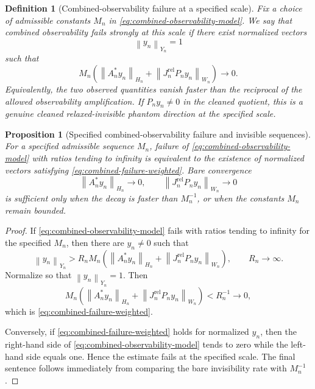 \documentclass[11pt]{article}
\numberwithin{equation}{section}
\newtheorem{proposition}[theorem]{Proposition}
\newtheorem{definition}[theorem]{Definition}
\newcommand{\norm}[2]{\left\|#1\right\|_{#2}}
\begin{document}
\begin{definition}[Combined-observability failure at a specified scale]
Fix a choice of admissible constants \(M_n\) in \eqref{eq:combined-observability-model}. We say that combined observability fails strongly at this scale if there exist normalized vectors
\[
\norm{y_n}{Y_n}=1
\]
such that
\begin{equation}\label{eq:combined-failure-weighted}
M_n\left(
\norm{A_n^*y_n}{H_n}
+
\norm{J_n^{\mathrm{rel}}P_ny_n}{W_n}
\right)
\to0.
\end{equation}
Equivalently, the two observed quantities vanish faster than the reciprocal of the allowed observability amplification.  If \(P_ny_n\neq0\) in the cleaned quotient, this is a genuine cleaned relaxed-invisible phantom direction at the specified scale.
\end{definition}

\begin{proposition}[Specified combined-observability failure and invisible sequences]
For a specified admissible sequence \(M_n\), failure of \eqref{eq:combined-observability-model} with ratios tending to infinity is equivalent to the existence of normalized vectors satisfying \eqref{eq:combined-failure-weighted}.  Bare convergence
\[
\norm{A_n^*y_n}{H_n}\to0,
\qquad
\norm{J_n^{\mathrm{rel}}P_ny_n}{W_n}\to0
\]
is sufficient only when the decay is faster than \(M_n^{-1}\), or when the constants \(M_n\) remain bounded.
\end{proposition}

\begin{proof}
If \eqref{eq:combined-observability-model} fails with ratios tending to infinity for the specified \(M_n\), then there are \(y_n\neq0\) such that
\[
\norm{y_n}{Y_n}
>
R_nM_n\left(
\norm{A_n^*y_n}{H_n}
+
\norm{J_n^{\mathrm{rel}}P_ny_n}{W_n}
\right),
\qquad R_n\to\infty.
\]
Normalize so that \(\norm{y_n}{Y_n}=1\). Then
\[
M_n\left(
\norm{A_n^*y_n}{H_n}
+
\norm{J_n^{\mathrm{rel}}P_ny_n}{W_n}
\right)<R_n^{-1}\to0,
\]
which is \eqref{eq:combined-failure-weighted}.

Conversely, if \eqref{eq:combined-failure-weighted} holds for normalized \(y_n\), then the right-hand side of \eqref{eq:combined-observability-model} tends to zero while the left-hand side equals one. Hence the estimate fails at the specified scale. The final sentence follows immediately from comparing the bare invisibility rate with \(M_n^{-1}\).
\end{proof}
\end{document}
